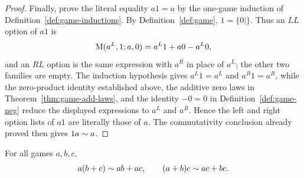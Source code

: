 \begin{proof}
  Finally, prove the literal equality \(a1=a\) by the one-game induction of
  Definition~\ref{def:game-inductions}.  By Definition~\ref{def:game},
  \(1=\{0\mid\}\).  Thus an \(LL\) option of \(a1\) is
  \[
    \operatorname{M}(a^L,1;a,0)=a^L1+a0-a^L0,
  \]
  and an \(RL\) option is the same expression with \(a^R\) in place of
  \(a^L\); the other two families are empty.  The induction hypothesis gives
  \(a^L1=a^L\) and \(a^R1=a^R\), while the zero-product identity established
  above, the additive zero laws in Theorem~\ref{thm:game-add-laws}, and the
  identity \(-0=0\) in Definition~\ref{def:game-neg} reduce the displayed
  expressions to \(a^L\) and \(a^R\).  Hence the left and right option lists of \(a1\) are
  literally those of \(a\).  The commutativity conclusion already proved then
  gives \(1a\sim a\).
\end{proof}
\begin{theorem}
  \label{thm:game-distrib}
  \leanok
  For all games \(a,b,c\),
  \[
    a(b+c)\sim ab+ac,
    \qquad
    (a+b)c\sim ac+bc.
  \]
\end{theorem}
